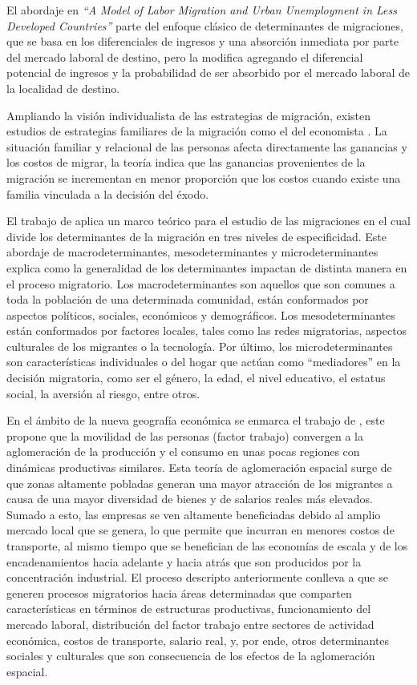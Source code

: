 \documentclass[12pt,a4paper]{article}
\begin{document}
El abordaje en \textit{``A Model of Labor Migration and Urban Unemployment in Less Developed Countries''} \parencite{todaro_model_1969} parte del enfoque clásico de determinantes de migraciones, que se basa en los diferenciales de ingresos y una absorción inmediata por parte del mercado laboral de destino, pero la modifica agregando el diferencial potencial de ingresos y la probabilidad de ser absorbido por el mercado laboral de la localidad de destino. 

Ampliando la visión individualista de las estrategias de migración, existen estudios de estrategias familiares de la migración como el del economista \textcite{mincer_family_1978}. La situación familiar y relacional de las personas afecta directamente las ganancias y los costos de migrar, la teoría indica que las ganancias provenientes de la migración se incrementan en menor proporción que los costos cuando existe una familia vinculada a la decisión del éxodo. 

El trabajo de \textcite{kuhnt_literature_2019} aplica un marco teórico para el estudio de las migraciones en el cual divide los determinantes de la migración en tres niveles de especificidad. Este abordaje de macrodeterminantes, mesodeterminantes y microdeterminantes explica como la generalidad de los determinantes impactan de distinta manera en el proceso migratorio. Los macrodeterminantes son aquellos que son comunes a toda la población de una determinada comunidad, están conformados por aspectos políticos, sociales, económicos y demográficos. Los mesodeterminantes están conformados por factores locales, tales como las redes migratorias, aspectos culturales de los migrantes o la tecnología. Por último, los microdeterminantes son características individuales o del hogar que actúan como ``mediadores'' en la decisión migratoria, como ser el género, la edad, el nivel educativo, el estatus social, la aversión al riesgo, entre otros. 

En el ámbito de la nueva geografía económica se enmarca el trabajo de \textcite{krugman_increasing_1991}, este  propone que la movilidad de las personas (factor trabajo) convergen a la aglomeración de la producción y el consumo en unas pocas regiones con dinámicas productivas similares. Esta teoría de aglomeración espacial surge de que  zonas altamente pobladas generan una mayor atracción de los migrantes a causa de una mayor diversidad de bienes y de salarios reales más elevados. Sumado a esto, las empresas se ven altamente beneficiadas debido al amplio mercado local que se genera, lo que permite que incurran en menores costos de transporte, al mismo tiempo que se benefician de las economías de escala y de los encadenamientos hacia adelante y hacia atrás que son producidos por la concentración industrial. El proceso descripto anteriormente conlleva a que se generen procesos migratorios hacia áreas determinadas que comparten características en términos de estructuras productivas, funcionamiento del mercado laboral, distribución del factor trabajo entre sectores de actividad económica, costos de transporte, salario real, y, por ende, otros determinantes sociales y culturales que son consecuencia de los efectos de la aglomeración espacial.
\end{document}
